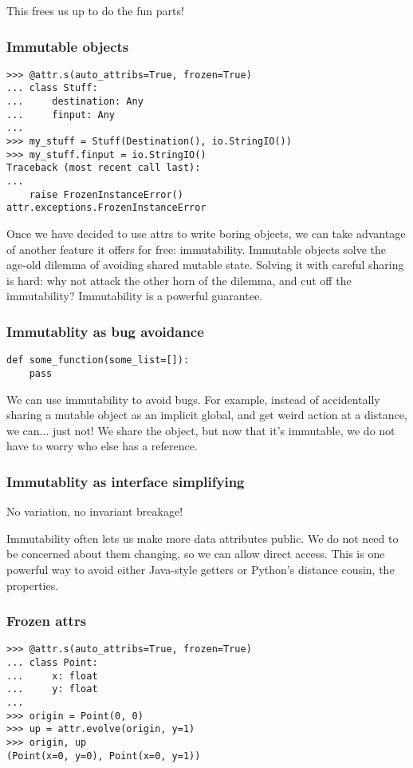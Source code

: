 This frees us up to do the fun parts!

\begin{frame}[fragile]
\frametitle{Immutable objects}

\begin{lstlisting}
>>> @attr.s(auto_attribs=True, frozen=True)
... class Stuff:
...     destination: Any
...     finput: Any
... 
>>> my_stuff = Stuff(Destination(), io.StringIO())
>>> my_stuff.finput = io.StringIO()
Traceback (most recent call last):
...
    raise FrozenInstanceError()
attr.exceptions.FrozenInstanceError
\end{lstlisting}

\end{frame}

Once we have decided to use attrs to write boring objects,
we can take advantage of another feature it offers
for free:
immutability.
Immutable objects solve the age-old dilemma of avoiding shared mutable state.
Solving it with careful sharing is hard:
why not attack the other horn of the dilemma,
and cut off the immutability?
Immutability is a powerful guarantee.

\begin{frame}[fragile]
\frametitle{Immutablity as bug avoidance}

\begin{lstlisting}
def some_function(some_list=[]):
    pass
\end{lstlisting}

\end{frame}

We can use immutability to avoid bugs.
For example,
instead of accidentally sharing a mutable object
as an implicit global,
and get weird action at a distance,
we can...
just not!
We share the object,
but now that it's immutable,
we do not have to worry who else has a reference.

\begin{frame}[fragile]
\frametitle{Immutablity as interface simplifying}

No variation, no invariant breakage!
\end{frame}

Immutability often lets us make more data attributes public.
We do not need to be concerned about them changing,
so we can allow direct access.
This is one powerful way to avoid either Java-style
getters
or Python's distance cousin,
the properties.

\begin{frame}[fragile]
\frametitle{Frozen attrs}

\begin{lstlisting}
>>> @attr.s(auto_attribs=True, frozen=True)
... class Point:
...     x: float
...     y: float
... 
>>> origin = Point(0, 0)
>>> up = attr.evolve(origin, y=1)
>>> origin, up
(Point(x=0, y=0), Point(x=0, y=1))
\end{lstlisting}

\end{frame}

